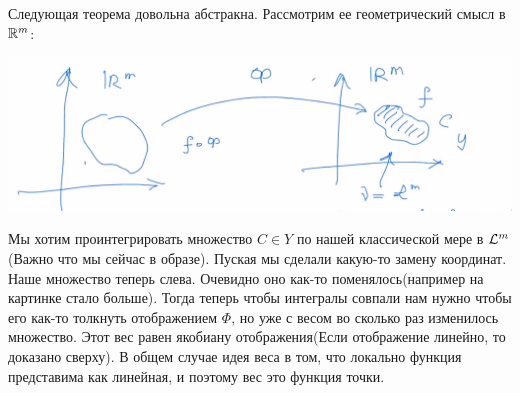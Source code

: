 \begin{interpret}
    Следующая теорема довольна абстракна. Рассмотрим ее геометрический смысл в $\mathbb{R}^m$:


\begin{minipage}{1.0\textwidth}%
    \includegraphics[width=1.0\textwidth]{images/Screenshot_15.png} 
\end{minipage}%
\hfill%
Мы хотим проинтегрировать множество $C \in Y$ по нашей классической мере в $\mathcal{L}^m$ (Важно что мы сейчас в образе). Пуская мы сделали какую-то замену координат. Наше множество теперь слева. Очевидно оно как-то поменялось(например на картинке стало больше). Тогда теперь чтобы интегралы совпали нам нужно чтобы его как-то толкнуть отображением $\Phi$, но уже с весом во сколько раз изменилось множество. Этот вес равен якобиану отображения(Если отображение линейно, то доказано сверху). В общем случае идея веса в том, что локально функция представима как линейная, и поэтому вес это функция точки.
\end{interpret}

